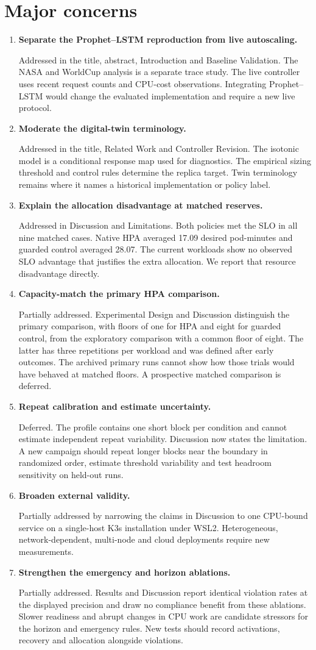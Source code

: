 \documentclass[10pt,a4paper]{article}
\newcommand{\reply}[2]{\item \textbf{#1}\par\noindent #2}
\begin{document}
\section*{Major concerns}
\begin{enumerate}
\reply{Separate the Prophet--LSTM reproduction from live autoscaling.}{Addressed in the title, abstract, Introduction and Baseline Validation. The NASA and WorldCup analysis is a separate trace study. The live controller uses recent request counts and CPU-cost observations. Integrating Prophet--LSTM would change the evaluated implementation and require a new live protocol.}
\reply{Moderate the digital-twin terminology.}{Addressed in the title, Related Work and Controller Revision. The isotonic model is a conditional response map used for diagnostics. The empirical sizing threshold and control rules determine the replica target. Twin terminology remains where it names a historical implementation or policy label.}
\reply{Explain the allocation disadvantage at matched reserves.}{Addressed in Discussion and Limitations. Both policies met the SLO in all nine matched cases. Native HPA averaged 17.09 desired pod-minutes and guarded control averaged 28.07. The current workloads show no observed SLO advantage that justifies the extra allocation. We report that resource disadvantage directly.}
\reply{Capacity-match the primary HPA comparison.}{Partially addressed. Experimental Design and Discussion distinguish the primary comparison, with floors of one for HPA and eight for guarded control, from the exploratory comparison with a common floor of eight. The latter has three repetitions per workload and was defined after early outcomes. The archived primary runs cannot show how those trials would have behaved at matched floors. A prospective matched comparison is deferred.}
\reply{Repeat calibration and estimate uncertainty.}{Deferred. The profile contains one short block per condition and cannot estimate independent repeat variability. Discussion now states the limitation. A new campaign should repeat longer blocks near the boundary in randomized order, estimate threshold variability and test headroom sensitivity on held-out runs.}
\reply{Broaden external validity.}{Partially addressed by narrowing the claims in Discussion to one CPU-bound service on a single-host K3s installation under WSL2. Heterogeneous, network-dependent, multi-node and cloud deployments require new measurements.}
\reply{Strengthen the emergency and horizon ablations.}{Partially addressed. Results and Discussion report identical violation rates at the displayed precision and draw no compliance benefit from these ablations. Slower readiness and abrupt changes in CPU work are candidate stressors for the horizon and emergency rules. New tests should record activations, recovery and allocation alongside violations.}

\end{enumerate}
\end{document}
